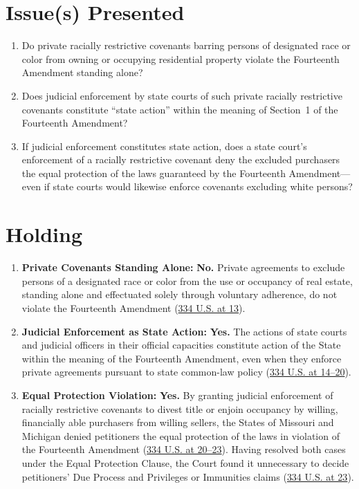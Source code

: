 \documentclass[12pt]{article}
\begin{document}
\section{Issue(s) Presented}

\begin{enumerate}
    \item Do private racially restrictive covenants barring persons of designated race or color from owning or occupying residential property violate the Fourteenth Amendment standing alone?
    \item Does judicial enforcement by state courts of such private racially restrictive covenants constitute ``state action'' within the meaning of Section~1 of the Fourteenth Amendment?
    \item If judicial enforcement constitutes state action, does a state court's enforcement of a racially restrictive covenant deny the excluded purchasers the equal protection of the laws guaranteed by the Fourteenth Amendment---even if state courts would likewise enforce covenants excluding white persons?
\end{enumerate}

\section{Holding}

\begin{enumerate}
    \item \textbf{Private Covenants Standing Alone:} \textbf{No.} Private agreements to exclude persons of a designated race or color from the use or occupancy of real estate, standing alone and effectuated solely through voluntary adherence, do not violate the Fourteenth Amendment (\href{https://supreme.justia.com/cases/federal/us/334/1/}{334 U.S. at 13}).
    \item \textbf{Judicial Enforcement as State Action:} \textbf{Yes.} The actions of state courts and judicial officers in their official capacities constitute action of the State within the meaning of the Fourteenth Amendment, even when they enforce private agreements pursuant to state common-law policy (\href{https://supreme.justia.com/cases/federal/us/334/1/}{334 U.S. at 14--20}).
    \item \textbf{Equal Protection Violation:} \textbf{Yes.} By granting judicial enforcement of racially restrictive covenants to divest title or enjoin occupancy by willing, financially able purchasers from willing sellers, the States of Missouri and Michigan denied petitioners the equal protection of the laws in violation of the Fourteenth Amendment (\href{https://supreme.justia.com/cases/federal/us/334/1/}{334 U.S. at 20--23}). Having resolved both cases under the Equal Protection Clause, the Court found it unnecessary to decide petitioners' Due Process and Privileges or Immunities claims (\href{https://supreme.justia.com/cases/federal/us/334/1/}{334 U.S. at 23}).
\end{enumerate}
\end{document}
